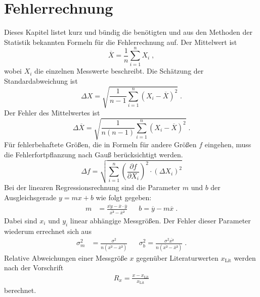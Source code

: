 \section{Fehlerrechnung}
Dieses Kapitel listet kurz und bündig die benötigten und aus den Methoden der Statistik bekannten Formeln für die Fehlerrechnung auf.
Der Mittelwert ist
\begin{equation}
  \overline{X} = \frac{1}{n} \sum_{i=1}^nX_i\;,
\end{equation}
wobei $X_i$ die einzelnen Messwerte beschreibt.
Die Schätzung der Standardabweichung ist
\begin{equation}
  \label{eq:std}
  \Delta X = \sqrt{\frac{1}{n-1}\sum_{i=1}^n(X_i-\overline{X})^2}     \; .
\end{equation}
Der Fehler des Mittelwertes ist
\begin{equation}
  \label{eq:std_mean}
  \Delta \overline{X} = \sqrt{\frac{1}{n(n-1)}\sum_{i=1}^n(X_i-\overline{X})^2}   \; .
\end{equation}
Für fehlerbehaftete Größen, die in Formeln für andere Größen $f$ eingehen, muss die Fehlerfortpflanzung nach Gauß berücksichtigt werden.
\begin{equation}
  \label{eq:GFFP}
  \Delta f = \sqrt{\sum_{i=1}^n \left(\frac{\partial f}{\partial X_i}\right)^2 \cdot (\Delta X_i)^2}
\end{equation}
Bei der linearen Regressionsrechnung sind die Parameter $m$ und $b$ der Ausgleichsgerade $y=mx+b$ wie folgt gegeben:
\begin{align}
  m &= \frac{\overline{xy}-\overline{x}\cdot\overline{y}}{\overline{x²} - \overline{x}²} & &  b = \overline{y} - m \overline{x}  \; .
\end{align}
Dabei sind $x_i$ und $y_i$ linear abhängige Messgrößen. Der Fehler dieser Parameter wiederum errechnet sich aus
\begin{align}
  \sigma_m^2 &= \frac{\sigma^2}{n(\overline{x²} - \overline{x}²)} & &\sigma_b^2 = \frac{\sigma^2\overline{x²}}{n(\overline{x²} - \overline{x}²)} \; .
\end{align}
Relative Abweichungen einer Messgröße $x$ gegenüber Literaturwerten $x_\text{Lit}$ werden nach der Vorschrift
\begin{align}
  R_x = \frac{x-x_\text{Lit}}{x_\text{Lit}}
\end{align}
berechnet.

